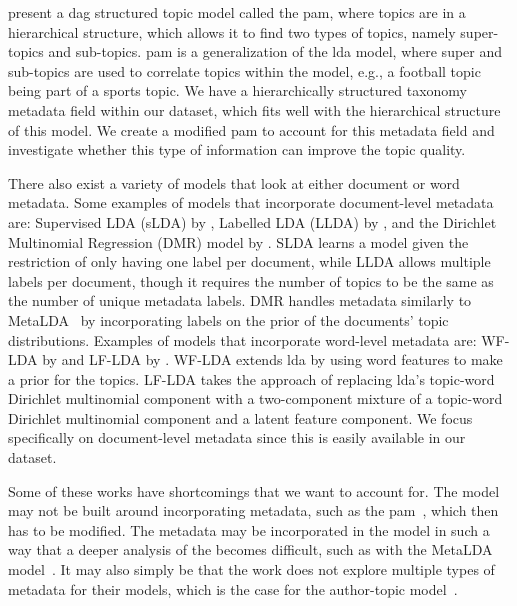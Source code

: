 \citet{li2006pachinko} present a \gls{dag} structured topic model called the \acrfull{pam}, where topics are in a hierarchical structure, which allows it to find two types of topics, namely super-topics and sub-topics. 
\Gls{pam} is a generalization of the \gls{lda} model, where super and sub-topics are used to correlate topics within the model, e.g., a football topic being part of a sports topic.
We have a hierarchically structured taxonomy metadata field within our dataset, which fits well with the hierarchical structure of this model.
We create a modified \gls{pam} to account for this metadata field and investigate whether this type of information can improve the topic quality.

There also exist a variety of models that look at either document or word metadata.
Some examples of models that incorporate document-level metadata are: Supervised LDA (sLDA) by \citet{blei2010supervised}, Labelled LDA (LLDA) by \citet{llda2009}, and the Dirichlet Multinomial Regression (DMR) model by \citet{mimno2008topic}.
SLDA learns a model given the restriction of only having one label per document, while LLDA allows multiple labels per document, though it requires the number of topics to be the same as the number of unique metadata labels.
DMR handles metadata similarly to MetaLDA~\cite{MetaLDA2017} by incorporating labels on the prior of the documents' topic distributions.
Examples of models that incorporate word-level metadata are: WF-LDA by \citet{wf-lda2010} and LF-LDA by \citet{lf-lda2015}.
WF-LDA extends \gls{lda} by using word features to make a prior for the topics.
LF-LDA takes the approach of replacing \gls{lda}'s topic-word Dirichlet multinomial component with a two-component mixture of a topic-word Dirichlet multinomial component and a latent feature component.
We focus specifically on document-level metadata since this is easily available in our dataset.

Some of these works have shortcomings that we want to account for.
The model may not be built around incorporating metadata, such as the \gls{pam}~\cite{li2006pachinko}, which then has to be modified.
The metadata may be incorporated in the model in such a way that a deeper analysis of the becomes difficult, such as with the MetaLDA model~\cite{MetaLDA2017}.
It may also simply be that the work does not explore multiple types of metadata for their models, which is the case for the author-topic model~\cite{author_topic_2012}.

